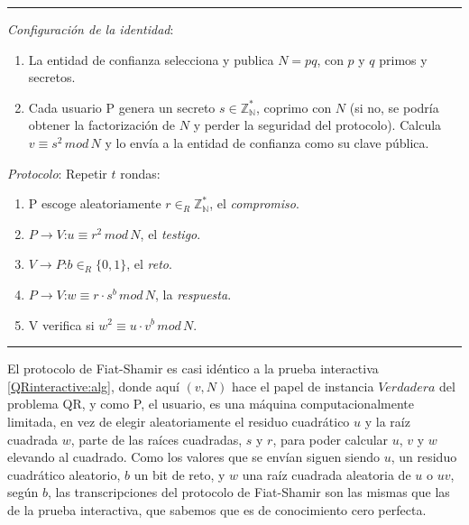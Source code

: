 \rule{\textwidth}{1pt}
\begin{algorithm}
	\hfil
	
	\textit{Configuración de la identidad}:
	\begin{enumerate}
		\item La entidad de confianza selecciona y publica $N=pq$, con $p$ y $q$ primos y secretos.
		
		\item Cada usuario P genera un secreto $s \in \mathbb{Z_N^*}$, coprimo con $N$ (si no, se podría obtener la factorización de $N$ y perder la seguridad del protocolo). Calcula $v \equiv s^2 \, mod \, N$ y lo envía a la entidad de confianza como su clave pública.
		
	\end{enumerate}
	
	
	\textit{Protocolo}: Repetir $t$ rondas:
	\begin{enumerate}
		\item P escoge aleatoriamente $r \in_R \mathbb{Z_N^*}$, el \textit{compromiso}.
		\item $P \rightarrow V$:\quad $u \equiv r^2 \, mod \, N$, el \textit{testigo}.
		\item $V \rightarrow P$:\quad $b \in_R \{0,1\}$, el \textit{reto}.
		\item $P \rightarrow V$:\quad $w \equiv r\cdot s^b \, mod \, N$, la \textit{respuesta}.
		\item V verifica si \quad $ w^2 \equiv u\cdot v^b \, mod \, N$.
	\end{enumerate}
	
\end{algorithm}
\rule{\textwidth}{1pt}

\hfil


El protocolo de Fiat-Shamir es casi idéntico a la prueba interactiva \ref{QRinteractive:alg}, donde aquí $(v,N)$ hace el papel de instancia $Verdadera$ del problema QR, y como P, el usuario, es una máquina computacionalmente limitada, en vez de elegir aleatoriamente el residuo cuadrático $u$ y la raíz cuadrada $w$, parte de las raíces cuadradas, $s$ y $r$, para poder calcular $u$, $v$ y $w$ elevando al cuadrado. Como los valores que se envían siguen siendo $u$, un residuo cuadrático aleatorio, $b$ un bit de reto, y $w$ una raíz cuadrada aleatoria de $u$ o $uv$, según $b$, las transcripciones del protocolo de Fiat-Shamir son las mismas que las de la prueba interactiva, que sabemos que es de conocimiento cero perfecta.


